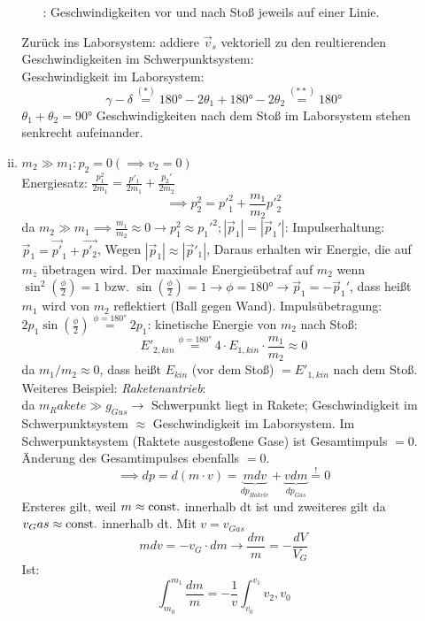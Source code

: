 \documentclass[a4paper,10pt]{scrartcl}
\begin{document}
\begin{sg}
\begin{enumerate}[a]
\begin{enumerate}[(i)]
\begin{itemize}
: Geschwindigkeiten vor und nach Stoß jeweils auf einer Linie.
\end{itemize}
Zurück ins Laborsystem: addiere $\vec v_s$ vektoriell zu den reultierenden Geschwindigkeiten im Schwerpunktsystem:\\
 Geschwindigkeit im Laborsystem: 
\fixme[unvollständig]
\[
 \gamma- \delta\stackrel{(*)}=180°-2\theta_1+180°-2 \theta_2\stackrel{(**)}= 180°
\]
$\theta_1+\theta_2=90°$ Geschwindigkeiten nach dem Stoß im Laborsystem stehen senkrecht aufeinander.
\item $m_2\gg m_1: p_2=0( \implies v_2=0)$\\
Energiesatz: $\frac{p_1^2}{2m_1}=\frac{p'_1}{2m_1}+\frac{p_2'}{2m_2}$
\[
 \implies p_2^2={p'}_1^2+ \frac{m_1}{m_2} {p'}_2^2
\]
da $m_2\gg m_1 \implies \frac{m_1}{m_2}\approx 0 \to p_1^2 \approx {p_1'}^2; |\vec p_1|=|\vec p_1'|$:
Impulserhaltung: $\vec p_1= \vec {p'}_1+\vec {p'_2}$, Wegen $|\vec p_1| \approx |\vec p'_1|$, \fixme[unvollständig]
Daraus erhalten wir Energie, die auf $m_z$ übetragen wird.
Der maximale Energieübetraf auf $m_2$ wenn $\sin^2(\frac{\phi}{2})=1$ bzw. $\sin(\frac{\phi}{2})=1 \to \phi=180° \to \vec p_1=-\vec p_1'$, dass heißt $m_1$ wird von $m_2$ reflektiert (Ball gegen Wand).
Impulsübetragung: $2p_1 \sin(\frac{\phi}{2})\stackrel{\phi=180°}=2p_1$:
kinetische Energie von $m_2$ nach Stoß:
\[
 {E'}_{2,kin}\stackrel{\phi=180°}= 4\cdot E_{1,kin} \cdot \frac{m_1}{m_2}\approx 0
\]
da $m_1/m_2\approx 0$, dass heißt $E_{kin}$ (vor dem Stoß) $= E'_{1,kin}$ nach dem Stoß.  
Weiteres Beispiel: \emph{Raketenantrieb}:
\\
da $m_Rakete \gg g_{Gus} \to $ Schwerpunkt liegt in Rakete; Geschwindigkeit im Schwerpunktsystem $\approx$ Geschwindigkeit im Laborsystem.
Im Schwerpunktsystem (Raktete ausgestoßene Gase) ist Gesamtimpuls $=0$. Änderung des Gesamtimpulses ebenfalls $=0$.
\[
 \implies dp= d(m\cdot v) = \underbrace{m dv}_{dp_{Rakete}} + \underbrace{v dm}_{dp_{Gas}} \stackrel{!}=0
\]
Ersteres gilt, weil $m\approx \text{const}.$ innerhalb dt ist und zweiteres gilt da $v_Gas \approx \text{const}.$ innerhalb dt.
Mit $v= v_{Gas}$
\[
 mdv= - v_G \cdot dm \to \frac{dm}{m} = - \frac{dV}{V_G}
\]
Ist: 
\[
 \int_{m_0}^{m_1} \frac{dm}{m}= - \frac{1}{v} \int_{v_0}^{v_1} v_2, v_0
\]





\end{enumerate}






 \end{enumerate}
\end{sg}
\end{document}

